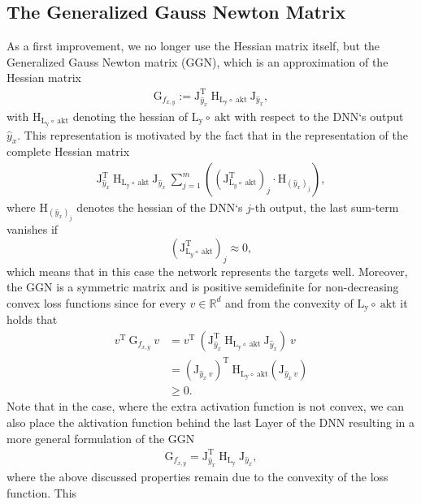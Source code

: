 \documentclass[conference]{IEEEtran}
\begin{document}
\subsection{The Generalized Gauss Newton Matrix}
As a first improvement, we no longer use the Hessian matrix itself, but the Generalized Gauss Newton matrix (GGN), which is an approximation of the Hessian matrix
\begin{align}
\mathrm{G}_{f_{x, y}} := \mathrm{J}_{\hat{y}_{x}}^{\mathrm{T}}\:\mathrm{H}_{\mathrm{L_{y}\circ\:\text{akt}}}\:\mathrm{J}_{\hat{y}_{x}},
\end{align}
with $\mathrm{H}_{\mathrm{L_{y}\circ\:\text{akt}}}$ denoting the hessian of $\mathrm{L_{y}\circ\:\text{akt}}$ with respect to the DNN`s output $\hat{y}_{x}$.
This representation is motivated by the fact that in the representation of the complete Hessian matrix
\begin{align}
\mathrm{J}_{\hat{y}_{x}}^{\mathrm{T}}\:\mathrm{H}_{\mathrm{L_{y}\circ\:\text{akt}}}\:\mathrm{J}_{\hat{y}_{x}}\:\sum_{j = 1}^{m}\left(\left(\mathrm{J}_{\mathrm{L}_{y}\circ \:\text{akt}}^{\mathrm{T}}\right)_{j}\cdot\mathrm{H}_{(\hat{y}_{x})_{j}}\right),
\end{align}
where $\mathrm{H}_{(\hat{y}_{x})_{j}}$ denotes the hessian of the DNN`s  $j$-th output, the last sum-term vanishes if 
$$\left(\mathrm{J}_{\mathrm{L}_{y}\circ \:\text{akt}}^{\mathrm{T}}\right)_{j}\approx 0,$$
which means that in this case the network represents the targets well.  Moreover, the GGN is a symmetric matrix and is positive semidefinite for non-decreasing convex loss functions since for every $v\in\mathbb{R}^{d}$ and from the convexity of $\mathrm{L_{y}\circ\:\text{akt}}$ it holds that
\begin{align}
v^{\mathrm{T}}\:\mathrm{G}_{f_{x, y}}\:v &= v^{\mathrm{T}}\:\left( \mathrm{J}_{\hat{y}_{x}}^{\mathrm{T}}\:\mathrm{H}_{\mathrm{L_{y}\circ\:\text{akt}}}\:\mathrm{J}_{\hat{y}_{x}}\right)\:v\\
&= \left(\mathrm{J}_{\hat{y}_{x}\:v}\right)^{\mathrm{T}}\:\mathrm{H}_{\mathrm{L_{y}\circ\:\text{akt}}}\left(\mathrm{J}_{\hat{y}_{x}\:v}\right) \\
&\geq 0.
\end{align}
Note that in the case, where the extra activation function is not convex, we can also place the aktivation function behind the last Layer of the DNN resulting in a more general formulation of the GGN
\begin{align}
\mathrm{G}_{f_{x, y}} = \mathrm{J}_{\hat{y}_{x}}^{\mathrm{T}}\:\mathrm{H}_{\mathrm{L_{y}}}\:\mathrm{J}_{\hat{y}_{x}},
\end{align}
where the above discussed properties remain due to the convexity of the loss function.
This 
\end{document}
